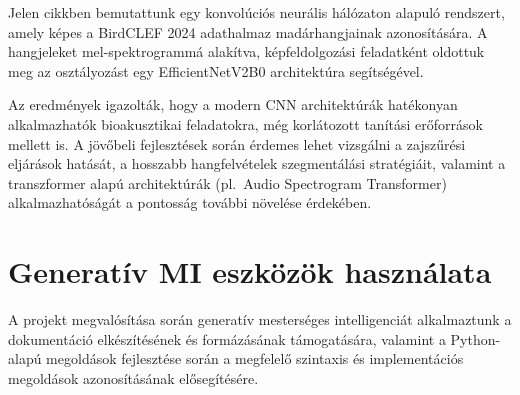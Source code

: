 \documentclass[journal]{IEEEtran}
\begin{document}
 Jelen cikkben bemutattunk egy konvolúciós neurális hálózaton alapuló rendszert, amely képes a BirdCLEF 2024 adathalmaz madárhangjainak azonosítására. A hangjeleket mel-spektrogrammá alakítva, képfeldolgozási feladatként oldottuk meg az osztályozást egy EfficientNetV2B0 architektúra segítségével.

 Az eredmények igazolták, hogy a modern CNN architektúrák hatékonyan alkalmazhatók bioakusztikai feladatokra, még korlátozott tanítási erőforrások mellett is. A jövőbeli fejlesztések során érdemes lehet vizsgálni a zajszűrési eljárások hatását, a hosszabb hangfelvételek szegmentálási stratégiáit, valamint a transzformer alapú architektúrák (pl.~Audio Spectrogram Transformer) alkalmazhatóságát a pontosság további növelése érdekében.




{
\appendices
\section*{Generatív MI eszközök használata}
  A projekt megvalósítása során generatív mesterséges intelligenciát alkalmaztunk a dokumentáció elkészítésének és formázásának támogatására, valamint a Python-alapú megoldások fejlesztése során a megfelelő szintaxis és implementációs megoldások azonosításának elősegítésére.
}


\newpage




\vfill
\end{document}
